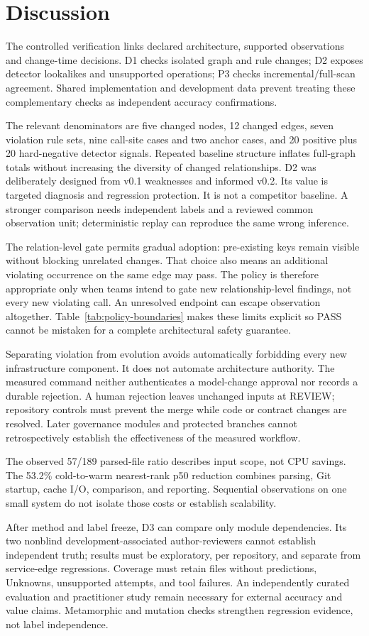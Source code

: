 \section{Discussion}

The controlled verification links declared architecture, supported observations and change-time decisions. D1 checks isolated graph and rule changes; D2 exposes detector lookalikes and unsupported operations; P3 checks incremental/full-scan agreement. Shared implementation and development data prevent treating these complementary checks as independent accuracy confirmations.

The relevant denominators are five changed nodes, 12 changed edges, seven violation rule sets, nine call-site cases and two anchor cases, and 20 positive plus 20 hard-negative detector signals. Repeated baseline structure inflates full-graph totals without increasing the diversity of changed relationships. D2 was deliberately designed from v0.1 weaknesses and informed v0.2. Its value is targeted diagnosis and regression protection. It is not a competitor baseline. A stronger comparison needs independent labels and a reviewed common observation unit; deterministic replay can reproduce the same wrong inference.

The relation-level gate permits gradual adoption: pre-existing keys remain visible without blocking unrelated changes. That choice also means an additional violating occurrence on the same edge may pass. The policy is therefore appropriate only when teams intend to gate new relationship-level findings, not every new violating call. An unresolved endpoint can escape observation altogether. Table~\ref{tab:policy-boundaries} makes these limits explicit so PASS cannot be mistaken for a complete architectural safety guarantee.

Separating violation from evolution avoids automatically forbidding every new infrastructure component. It does not automate architecture authority. The measured command neither authenticates a model-change approval nor records a durable rejection. A human rejection leaves unchanged inputs at REVIEW; repository controls must prevent the merge while code or contract changes are resolved. Later governance modules and protected branches cannot retrospectively establish the effectiveness of the measured workflow.

The observed 57/189 parsed-file ratio describes input scope, not CPU savings. The 53.2\% cold-to-warm nearest-rank p50 reduction combines parsing, Git startup, cache I/O, comparison, and reporting. Sequential observations on one small system do not isolate those costs or establish scalability.

After method and label freeze, D3 can compare only module dependencies. Its two nonblind development-associated author-reviewers cannot establish independent truth; results must be exploratory, per repository, and separate from service-edge regressions. Coverage must retain files without predictions, Unknowns, unsupported attempts, and tool failures. An independently curated evaluation and practitioner study remain necessary for external accuracy and value claims. Metamorphic and mutation checks strengthen regression evidence, not label independence.
